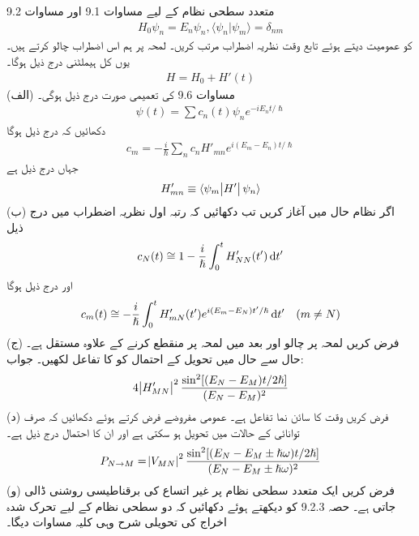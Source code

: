 متعدد سطحی نظام کے لیے مساوات \num{9.1} اور مساوات \num{9.2} 
\begin{align}
	H_0\psi_n = E_n\psi_n, \langle \psi_n|\psi_m \rangle = \delta_{nm}
\end{align}
کو عمومیت دیتے ہوئے تابع وقت نظریہ اضطراب  مرتب کریں۔ لمحہ  پر ہم اس اضطراب  چالو کرتے ہیں۔ یوں کل ہیملٹنی درج ذیل ہوگا۔
\begin{align}
	H = H_0 + H'(t)
\end{align}
(الف) مساوات \num{9.6} کی تعمیمی صورت درج ذیل ہوگی۔
\begin{align}
	\psi(t) = \sum c_n(t)\psi_ne^{-iE_nt/\hslash}
\end{align}
دکھائیں کہ درج ذیل ہوگا
\begin{align}
	c_m = -\frac{i}{\hslash}\sum_{n} c_nH'_{mn}e^{i(E_m-E_n)t/\hslash}
\end{align}
جہاں  درج ذیل ہے
\begin{align}
	H'_{mn} \equiv \langle \psi_m\abs{H'}\psi_n \rangle
\end{align}
(ب) اگر نظام حال  میں آغاز کریں تب دکھائیں کہ رتبہ اول نظریہ اضطراب میں درج ذیل
\begin{align}
	c_N(t)\cong1-\frac{i}{\hslash}\int_{0}^{t}H'_{NN}(t')\dif t'
\end{align}
اور درج ذیل ہوگا
\begin{align}
	c_m(t)\cong-\frac{i}{\hslash}\int_{0}^{t}H'_{mN}(t')e^{i(E_m-E_N)t'/\hslash}\dif t'\quad(m\neq N)
\end{align}
(ج) فرض کریں لمحہ  پر چالو اور بعد میں لمحہ  پر منقطع کرنے کے علاوہ  مستقل ہے۔ حال  سے حال  میں تحویل کے احتمال کو  کا تفاعل لکھیں۔ جواب:
\begin{align}
	4\abs{H'_{MN}}^2\frac{\sin^2[(E_N-E_M)t/2\hslash]}{(E_N-E_M)^2}
\end{align}
(د) فرض کریں  وقت کا سائن نما تفاعل  ہے۔ عمومی مفروضے فرض کرتے ہوئے دکھائیں کہ صرف توانائی  کے حالات میں تحویل ہو سکتی ہے اور ان کا احتمال درج ذیل ہے۔
\begin{align}
	P_{N\to M} = \abs{V_{MN}}^2\frac{\sin^2[(E_N-E_M\pm\hslash\omega)t/2\hslash]}{(E_N-E_M\pm\hslash\omega)^2}
\end{align}
(و) فرض کریں ایک متعدد سطحی نظام پر غیر اتساع کی برقناطیسی روشنی ڈالی جاتی ہے۔ حصہ 9.2.3 کو دیکھتے ہوئے دکھائیں کہ دو سطحی نظام کے لیے تحرک شدہ اخراج کی تحویلی شرح وہی کلیہ مساوات  دیگا۔
